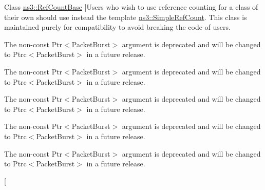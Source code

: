\begin{DoxyRefList}
\hypertarget{deprecated__deprecated000003}{}%
Class \hyperlink{classns3_1_1RefCountBase}{ns3\+:\+:Ref\+Count\+Base} ]Users who wish to use reference counting for a class of their own should use instead the template \hyperlink{classns3_1_1SimpleRefCount}{ns3\+::\+Simple\+Ref\+Count}. This class is maintained purely for compatibility to avoid breaking the code of users.  
\item[\label{deprecated__deprecated000040}%
\hypertarget{deprecated__deprecated000040}{}%
Member \hyperlink{classns3_1_1SimpleOfdmWimaxPhy_a1681c13eaa52d28c39f2232b9148417d}{ns3\+:\+:Simple\+Ofdm\+Wimax\+Phy\+:\+:m\+\_\+phy\+Rx\+Begin\+Trace} ]The non-\/const {\ttfamily Ptr$<$\+Packet\+Burst$>$} argument is deprecated and will be changed to {\ttfamily Ptrc$<$\+Packet\+Burst$>$} in a future release.  
\item[\label{deprecated__deprecated000042}%
\hypertarget{deprecated__deprecated000042}{}%
Member \hyperlink{classns3_1_1SimpleOfdmWimaxPhy_a0dc52213d50436ee17875d8fee2671ce}{ns3\+:\+:Simple\+Ofdm\+Wimax\+Phy\+:\+:m\+\_\+phy\+Rx\+Drop\+Trace} ]The non-\/const {\ttfamily Ptr$<$\+Packet\+Burst$>$} argument is deprecated and will be changed to {\ttfamily Ptrc$<$\+Packet\+Burst$>$} in a future release.  
\item[\label{deprecated__deprecated000041}%
\hypertarget{deprecated__deprecated000041}{}%
Member \hyperlink{classns3_1_1SimpleOfdmWimaxPhy_a02734dac1757daecf21e5c53fced860e}{ns3\+:\+:Simple\+Ofdm\+Wimax\+Phy\+:\+:m\+\_\+phy\+Rx\+End\+Trace} ]The non-\/const {\ttfamily Ptr$<$\+Packet\+Burst$>$} argument is deprecated and will be changed to {\ttfamily Ptrc$<$\+Packet\+Burst$>$} in a future release.  
\item[\label{deprecated__deprecated000037}%
\hypertarget{deprecated__deprecated000037}{}%
Member \hyperlink{classns3_1_1SimpleOfdmWimaxPhy_a21e5bdd806cdcf9776bf226d23fc98ca}{ns3\+:\+:Simple\+Ofdm\+Wimax\+Phy\+:\+:m\+\_\+phy\+Tx\+Begin\+Trace} ]The non-\/const {\ttfamily Ptr$<$\+Packet\+Burst$>$} argument is deprecated and will be changed to {\ttfamily Ptrc$<$\+Packet\+Burst$>$} in a future release.  
\item[\label{deprecated__deprecated000039}%
\hypertarget{deprecated__deprecated000039}{}%
Member \hyperlink{classns3_1_1SimpleOfdmWimaxPhy_aebbb0af4dbce1a78fa142597a96b3910}{ns3\+:\+:Simple\+Ofdm\+Wimax\+Phy\+:\+:m\+\_\+phy\+Tx\+Drop\+Trace} ]The non-\/const {\ttfamily Ptr$<$\+Packet\+Burst$>$} argument is deprecated and will be changed to {\ttfamily Ptrc$<$\+Packet\+Burst$>$} in a future release.  
\item[\label{deprecated__deprecated000038}%

\end{DoxyRefList}
